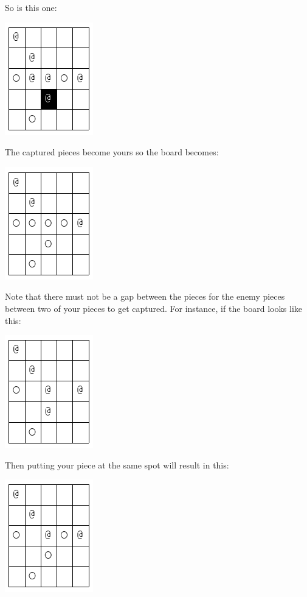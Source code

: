So is this one:

\includegraphics[scale=0.5]{pic4.png}

The captured pieces become yours so the board becomes:

\includegraphics[scale=0.5]{pic5.png}

Note that there must not be a gap between the pieces for the enemy pieces
between two of your pieces to get captured. For instance, if the board looks
like this:

\includegraphics[scale=0.5]{pic6.png}

Then putting your piece at the same spot will result in this:

\includegraphics[scale=0.5]{pic7.png}

